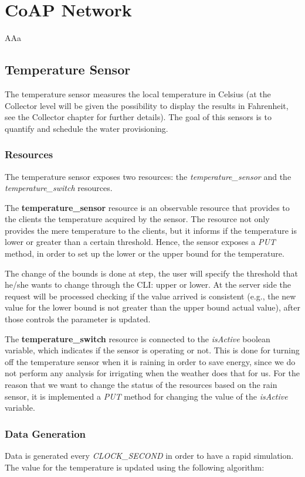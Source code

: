 \section{CoAP Network}
AAa




\subsection{Temperature Sensor}
The temperature sensor measures the local temperature in Celsius (at the Collector level will be given the possibility to display the results in Fahrenheit, see the Collector chapter for further details). The goal of this sensors is to quantify and schedule the water provisioning.

\subsubsection{Resources}
The temperature sensor exposes two resources: the \textit{temperature\_sensor} and the \textit{temperature\_switch} resources.

The \textbf{temperature\_sensor} resource is an observable resource that provides to the clients the temperature acquired by the sensor. The resource not only provides the mere temperature to the clients, but it informs if the temperature is lower or greater than a certain threshold. Hence, the sensor exposes a  \textit{PUT} method, in order to set up the lower or the upper bound for the temperature.

The change of the bounds is done at step, the user will specify the threshold that he/she wants to change through the CLI: upper or lower. At the server side the request will be processed checking if the value arrived is consistent (e.g., the new value for the lower bound is not greater than the upper bound actual value), after those controls the parameter is updated.

The \textbf{temperature\_switch} resource is connected to the \textit{isActive} boolean variable, which indicates if the sensor is operating or not. This is done for turning off the temperature sensor when it is raining in order to save energy, since we do not perform any analysis for irrigating when the weather does that for us. For the reason that we want to change the status of the resources based on the rain sensor, it is implemented a \textit{PUT} method for changing the value of the \textit{isActive} variable.

\subsubsection{Data Generation}
Data is generated every \textit{CLOCK\_SECOND} in order to have a rapid simulation. The value for the temperature is updated using the following algorithm:

